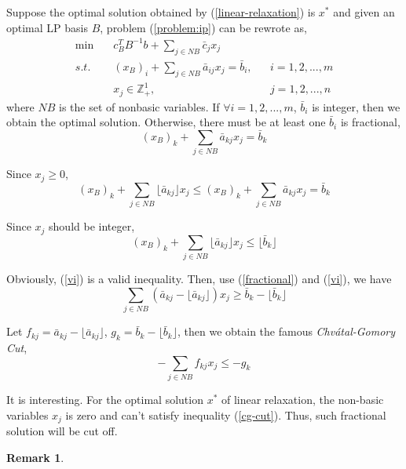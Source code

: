 \documentclass{article}
\newtheorem{remark}{Remark}
\begin{document}
Suppose the optimal solution obtained by (\ref{linear-relaxation}) is $x^*$ and given an optimal LP basis $B$, problem (\ref{problem:ip}) can be rewrote as,
\begin{align}
\min \quad & c_B^T B^{-1} b + \sum_{j \in NB} \bar{c}_jx_j \\
s.t. \quad & (x_B)_i + \sum_{j \in NB} \bar{a}_{ij}x_j = \bar{b}_i, && i = 1, 2, ..., m \\
& x_j \in \mathbb{Z}_+^1, && j = 1, 2, ..., n 
\end{align}
where $NB$ is the set of nonbasic variables. If $\forall i = 1, 2, ..., m$,  $\bar{b}_i$ is integer, then we obtain the optimal solution. Otherwise, there must be at least one $\bar{b}_i$ is fractional,
\begin{equation}
(x_B)_k + \sum_{j \in NB} \bar{a}_{kj}x_j = \bar{b}_k \label{fractional}
\end{equation}

 Since $x_j \geq 0$,
\begin{equation}
(x_B)_k + \sum_{j \in NB} \lfloor \bar{a}_{kj} \rfloor x_j \leq (x_B)_k + \sum_{j \in NB} \bar{a}_{kj}x_j  = \bar{b}_k
\end{equation}

Since $x_j$ should be integer,
\begin{equation}
(x_B)_k + \sum_{j \in NB} \lfloor \bar{a}_{kj} \rfloor x_j \leq \lfloor \bar{b}_k  \rfloor \label{vi}
\end{equation}

 Obviously, (\ref{vi}) is a valid inequality. Then, use (\ref{fractional}) and (\ref{vi}), we have
\begin{equation}
\sum_{j \in NB} (\bar{a}_{kj} - \lfloor \bar{a}_{kj} \rfloor) x_j \geq \bar{b}_k -  \lfloor \bar{b}_k  \rfloor \label{sub}
\end{equation}

Let $f_{kj} = \bar{a}_{kj} - \lfloor \bar{a}_{kj} \rfloor$, $g_k =  \bar{b}_k -  \lfloor \bar{b}_k\rfloor $, then we obtain the famous \textit{Chv\'atal-Gomory Cut},
\begin{equation}
-\sum_{j \in NB} f_{kj} x_j \leq -g_k \label{cg-cut}
\end{equation}

 It is interesting. For the optimal solution $x^*$ of linear relaxation, the non-basic variables $x_j$ is zero and can't satisfy inequality (\ref{cg-cut}). Thus, such fractional solution will be cut off.
 
 \begin{remark}
 	
 \end{remark}
\end{document}
